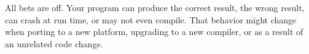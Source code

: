 All bets are off. Your program can produce the correct result, the wrong result, can crash at run time, or may not even compile. That behavior might change when porting to a new platform, upgrading to a new compiler, or as a result of an unrelated code change.
